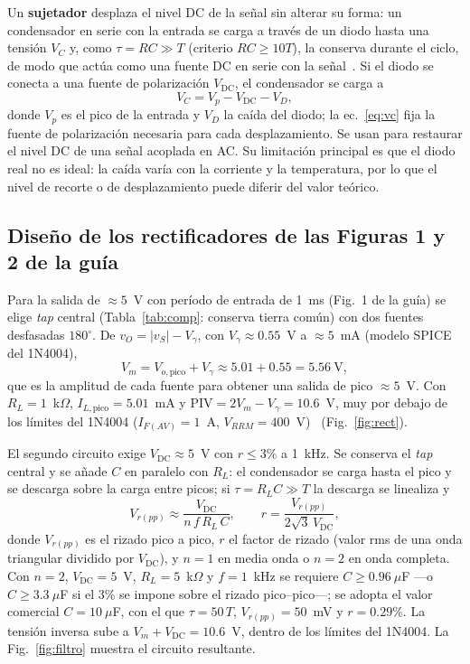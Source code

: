\documentclass[conference,10pt]{IEEEtran}
\newcommand{\VDC}{V_{\mathrm{DC}}}
\newcommand{\Vg}{V_\gamma}
\begin{document}
Un \textbf{sujetador} desplaza el nivel DC de la señal sin alterar su
forma: un condensador en serie con la entrada se carga a través de un
diodo hasta una tensión $V_C$ y, como $\tau=RC\gg T$ (criterio
$RC\ge10T$), la conserva durante el ciclo, de modo que actúa como una
fuente DC en serie con la señal~\cite{boylestad}. Si el diodo se
conecta a una fuente de polarización $\VDC$, el condensador se carga a
\begin{equation}
V_C=V_p-\VDC-V_D,
\label{eq:vc}
\end{equation}
donde $V_p$ es el pico de la entrada y $V_D$ la caída del diodo; la
ec.~\eqref{eq:vc} fija la fuente de polarización necesaria para cada
desplazamiento. Se usan para restaurar el nivel DC de una señal
acoplada en AC. Su limitación principal es que el diodo real no es
ideal: la caída varía con la corriente y la temperatura, por lo que
el nivel de recorte o de desplazamiento puede diferir del valor teórico.

\subsection{Diseño de los rectificadores de las Figuras 1 y 2 de la guía}
Para la salida de $\approx5$~V con período de entrada de 1~ms
(Fig.~1 de la guía) se elige \textit{tap} central
(Tabla~\ref{tab:comp}: conserva tierra común) con dos fuentes
desfasadas $180^\circ$. De $v_O=|v_S|-\Vg$, con $\Vg\approx0.55$~V a
$\approx5$~mA (modelo SPICE del 1N4004),
\begin{equation}
V_m=V_{o,\text{pico}}+\Vg\approx5.01+0.55=5.56\ \text{V},
\label{eq:vm}
\end{equation}
que es la amplitud de cada fuente para obtener una salida de pico
$\approx5$~V. Con $R_L=1$~k$\Omega$, $I_{L,\text{pico}}=5.01$~mA y
$\text{PIV}=2V_m-\Vg=10.6$~V, muy por debajo de los límites del
1N4004 ($I_{F(AV)}=1$~A, $V_{RRM}=400$~V)~\cite{vishay}
(Fig.~\ref{fig:rect}).

El segundo circuito exige $\VDC\approx5$~V con $r\le3\%$ a 1~kHz.
Se conserva el \textit{tap} central y se añade $C$ en paralelo con
$R_L$: el condensador se carga hasta el pico y se descarga sobre la
carga entre picos; si $\tau=R_LC\gg T$ la descarga se linealiza
y~\cite{sedra}
\begin{equation}
V_{r(pp)}\approx\frac{\VDC}{n\,f\,R_L\,C},
\qquad
r=\frac{V_{r(pp)}}{2\sqrt{3}\,\VDC},
\label{eq:rizado}
\end{equation}
donde $V_{r(pp)}$ es el rizado pico a pico, $r$ el factor de rizado
(valor rms de una onda triangular dividido por $\VDC$), y $n=1$ en
media onda o $n=2$ en onda completa. Con $n=2$, $\VDC=5$~V,
$R_L=5$~k$\Omega$ y $f=1$~kHz se requiere $C\ge0.96\ \mu$F
---o $C\ge3.3\ \mu$F si el 3\% se impone sobre el rizado
pico--pico---; se adopta el valor comercial $C=10\ \mu$F, con el que
$\tau=50\,T$, $V_{r(pp)}=50$~mV y $r=0.29\%$. La tensión inversa sube a
$V_m+\VDC=10.6$~V, dentro de los límites del 1N4004. La
Fig.~\ref{fig:filtro} muestra el circuito resultante.
\end{document}
